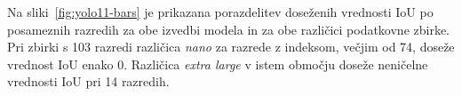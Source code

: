 \documentclass[a4paper,twoside,openright,12pt,slovene]{book}
\begin{document}
            Na sliki~\ref{fig:yolo11-bars}
            je
            prikazana porazdelitev doseženih vrednosti IoU po posameznih
            razredih za obe izvedbi modela in za obe različici podatkovne
            zbirke.
            Pri zbirki s 103 razredi različica \textit{nano} za razrede
            z indeksom, večjim od 74, doseže vrednost IoU enako \(0\).
            Različica \textit{extra large} v istem območju doseže neničelne
            vrednosti IoU pri 14 razredih.

\end{document}
